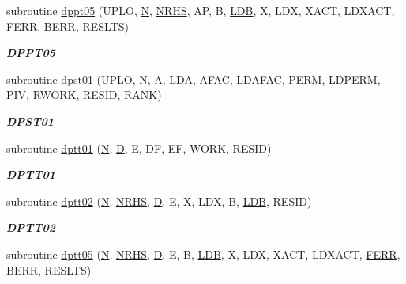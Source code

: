 \begin{DoxyCompactItemize}
subroutine \hyperlink{group__double__lin_gaf67579a3cc0bc6f8a9d841bb07e7a6c0}{dppt05} (U\+P\+L\+O, \hyperlink{polmisc_8c_a0240ac851181b84ac374872dc5434ee4}{N}, \hyperlink{example__user_8c_aa0138da002ce2a90360df2f521eb3198}{N\+R\+H\+S}, A\+P, B, \hyperlink{example__user_8c_a50e90a7104df172b5a89a06c47fcca04}{L\+D\+B}, X, L\+D\+X, X\+A\+C\+T, L\+D\+X\+A\+C\+T, \hyperlink{superlu__enum__consts_8h_af00a42ecad444bbda75cde1b64bd7e72a78fd14d7abebae04095cfbe02928f153}{F\+E\+R\+R}, B\+E\+R\+R, R\+E\+S\+L\+T\+S)
\begin{DoxyCompactList}\small\item\em {\bfseries D\+P\+P\+T05} \end{DoxyCompactList}\item 
subroutine \hyperlink{group__double__lin_ga650366ade9e4372c6e833f1eb80506fe}{dpst01} (U\+P\+L\+O, \hyperlink{polmisc_8c_a0240ac851181b84ac374872dc5434ee4}{N}, \hyperlink{classA}{A}, \hyperlink{example__user_8c_ae946da542ce0db94dced19b2ecefd1aa}{L\+D\+A}, A\+F\+A\+C, L\+D\+A\+F\+A\+C, P\+E\+R\+M, L\+D\+P\+E\+R\+M, P\+I\+V, R\+W\+O\+R\+K, R\+E\+S\+I\+D, \hyperlink{splinemodule_8c_a3a88bcc63386de30443dacede2e01847}{R\+A\+N\+K})
\begin{DoxyCompactList}\small\item\em {\bfseries D\+P\+S\+T01} \end{DoxyCompactList}\item 
subroutine \hyperlink{group__double__lin_gafdae23683d4d7fe43deaa133382d31cf}{dptt01} (\hyperlink{polmisc_8c_a0240ac851181b84ac374872dc5434ee4}{N}, \hyperlink{odrpack_8h_a7dae6ea403d00f3687f24a874e67d139}{D}, E, D\+F, E\+F, W\+O\+R\+K, R\+E\+S\+I\+D)
\begin{DoxyCompactList}\small\item\em {\bfseries D\+P\+T\+T01} \end{DoxyCompactList}\item 
subroutine \hyperlink{group__double__lin_ga2a6ea95124cdc1f806823508ed26590b}{dptt02} (\hyperlink{polmisc_8c_a0240ac851181b84ac374872dc5434ee4}{N}, \hyperlink{example__user_8c_aa0138da002ce2a90360df2f521eb3198}{N\+R\+H\+S}, \hyperlink{odrpack_8h_a7dae6ea403d00f3687f24a874e67d139}{D}, E, X, L\+D\+X, B, \hyperlink{example__user_8c_a50e90a7104df172b5a89a06c47fcca04}{L\+D\+B}, R\+E\+S\+I\+D)
\begin{DoxyCompactList}\small\item\em {\bfseries D\+P\+T\+T02} \end{DoxyCompactList}\item 
subroutine \hyperlink{group__double__lin_gaf80023aa040f390f5a6c38711a9d38ef}{dptt05} (\hyperlink{polmisc_8c_a0240ac851181b84ac374872dc5434ee4}{N}, \hyperlink{example__user_8c_aa0138da002ce2a90360df2f521eb3198}{N\+R\+H\+S}, \hyperlink{odrpack_8h_a7dae6ea403d00f3687f24a874e67d139}{D}, E, B, \hyperlink{example__user_8c_a50e90a7104df172b5a89a06c47fcca04}{L\+D\+B}, X, L\+D\+X, X\+A\+C\+T, L\+D\+X\+A\+C\+T, \hyperlink{superlu__enum__consts_8h_af00a42ecad444bbda75cde1b64bd7e72a78fd14d7abebae04095cfbe02928f153}{F\+E\+R\+R}, B\+E\+R\+R, R\+E\+S\+L\+T\+S)

\end{DoxyCompactItemize}
